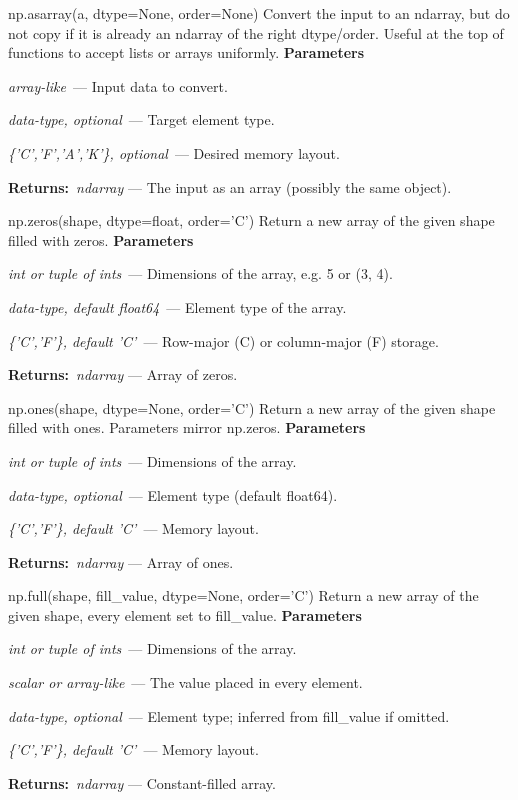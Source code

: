 \documentclass[10pt]{article}
\newenvironment{params}
  {\smallskip\textbf{\small\color{accent}Parameters}\par\nopagebreak
   \begin{description}[leftmargin=1.3em,itemsep=1.5pt,parsep=0pt,topsep=1pt,
      labelindent=0pt,style=sameline,font=\normalfont]}
  {\end{description}}
\newcommand{\pitem}[3]{\item[{\ttfamily\color{accent}#1}]{\itshape #2}\ --- #3}
\newcommand{\preturn}[2]{\smallskip\textbf{\small\color{accent}Returns:}\ {\itshape #1} --- #2\par}
\begin{document}
\begin{func}{np.asarray(a, dtype=None, order=None)}
Convert the input to an ndarray, but do not copy if it is already an ndarray of the right dtype/order. Useful at the top of functions to accept lists or arrays uniformly.
\begin{params}
\pitem{a}{array-like}{Input data to convert.}
\pitem{dtype}{data-type, optional}{Target element type.}
\pitem{order}{\{'C','F','A','K'\}, optional}{Desired memory layout.}
\end{params}
\preturn{ndarray}{The input as an array (possibly the same object).}
\end{func}
\medskip

\begin{func}{np.zeros(shape, dtype=float, order='C')}
Return a new array of the given shape filled with zeros.
\begin{params}
\pitem{shape}{int or tuple of ints}{Dimensions of the array, e.g. 5 or (3, 4).}
\pitem{dtype}{data-type, default float64}{Element type of the array.}
\pitem{order}{\{'C','F'\}, default 'C'}{Row-major (C) or column-major (F) storage.}
\end{params}
\preturn{ndarray}{Array of zeros.}
\end{func}
\medskip

\begin{func}{np.ones(shape, dtype=None, order='C')}
Return a new array of the given shape filled with ones. Parameters mirror np.zeros.
\begin{params}
\pitem{shape}{int or tuple of ints}{Dimensions of the array.}
\pitem{dtype}{data-type, optional}{Element type (default float64).}
\pitem{order}{\{'C','F'\}, default 'C'}{Memory layout.}
\end{params}
\preturn{ndarray}{Array of ones.}
\end{func}
\medskip

\begin{func}{np.full(shape, fill\_value, dtype=None, order='C')}
Return a new array of the given shape, every element set to fill\_value.
\begin{params}
\pitem{shape}{int or tuple of ints}{Dimensions of the array.}
\pitem{fill\_value}{scalar or array-like}{The value placed in every element.}
\pitem{dtype}{data-type, optional}{Element type; inferred from fill\_value if omitted.}
\pitem{order}{\{'C','F'\}, default 'C'}{Memory layout.}
\end{params}
\preturn{ndarray}{Constant-filled array.}
\end{func}
\medskip
\end{document}
